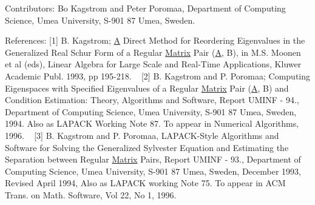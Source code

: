 \begin{DoxyParagraph}{Contributors\+: }
Bo Kagstrom and Peter Poromaa, Department of Computing Science, Umea University, S-\/901 87 Umea, Sweden. 
\end{DoxyParagraph}
\begin{DoxyParagraph}{References\+: }
\mbox{[}1\mbox{]} B. Kagstrom; \hyperlink{classA}{A} Direct Method for Reordering Eigenvalues in the Generalized Real Schur Form of a Regular \hyperlink{classMatrix}{Matrix} Pair (\hyperlink{classA}{A}, B), in M.\+S. Moonen et al (eds), Linear Algebra for Large Scale and Real-\/\+Time Applications, Kluwer Academic Publ. 1993, pp 195-\/218. ~\newline
 \mbox{[}2\mbox{]} B. Kagstrom and P. Poromaa; Computing Eigenspaces with Specified Eigenvalues of a Regular \hyperlink{classMatrix}{Matrix} Pair (\hyperlink{classA}{A}, B) and Condition Estimation\+: Theory, Algorithms and Software, Report U\+M\+I\+N\+F -\/ 94., Department of Computing Science, Umea University, S-\/901 87 Umea, Sweden, 1994. Also as L\+A\+P\+A\+C\+K Working Note 87. To appear in Numerical Algorithms, 1996. ~\newline
 \mbox{[}3\mbox{]} B. Kagstrom and P. Poromaa, L\+A\+P\+A\+C\+K-\/\+Style Algorithms and Software for Solving the Generalized Sylvester Equation and Estimating the Separation between Regular \hyperlink{classMatrix}{Matrix} Pairs, Report U\+M\+I\+N\+F -\/ 93., Department of Computing Science, Umea University, S-\/901 87 Umea, Sweden, December 1993, Revised April 1994, Also as L\+A\+P\+A\+C\+K working Note 75. To appear in A\+C\+M Trans. on Math. Software, Vol 22, No 1, 1996. 
\end{DoxyParagraph}
